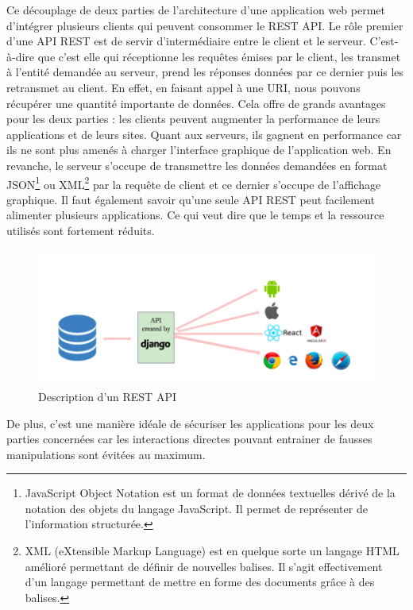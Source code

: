 Ce découplage de deux parties de l’architecture d’une application web permet d’intégrer plusieurs clients 
qui peuvent consommer le REST API.
Le rôle premier d’une API REST est de servir d’intermédiaire entre le client et le serveur. C’est-à-dire 
que c’est elle qui réceptionne les requêtes émises par le client, les transmet à l’entité demandée au serveur, 
prend les réponses données par ce dernier puis les retransmet au client.
En effet, en faisant appel à une URI, nous pouvons récupérer une quantité importante de données. Cela offre 
de grands avantages pour les deux parties : les clients peuvent augmenter la performance de leurs applications
 et de leurs sites. Quant aux serveurs, ils gagnent en performance car ils ne sont plus amenés à charger 
 l’interface graphique de l’application web. En revanche, le serveur s’occupe de transmettre les données 
 demandées en format JSON\footnote[9]{JavaScript Object Notation est un format de données textuelles dérivé de
la notation des objets du langage JavaScript. Il permet de représenter de l’information structurée.} ou 
XML\footnote[10]{XML (eXtensible Markup Language) est en quelque sorte un langage HTML amélioré permettant 
de définir de nouvelles balises. Il s'agit effectivement d'un langage permettant de mettre en forme des
documents grâce à des balises.}  par la requête de client et ce dernier s’occupe de l’affichage graphique.
Il faut également savoir qu’une seule API REST peut facilement alimenter plusieurs applications. Ce qui veut 
dire que le temps et la ressource utilisés sont fortement réduits.
\begin{figure}[hp]
    \centering
    \includegraphics{images/rest_api_pres.png}
    \caption{Description d'un REST API}
\end{figure}

De plus, c’est une manière idéale de sécuriser les applications pour les deux parties concernées car 
les interactions directes pouvant entrainer de fausses manipulations sont évitées au maximum.
\pagebreak
